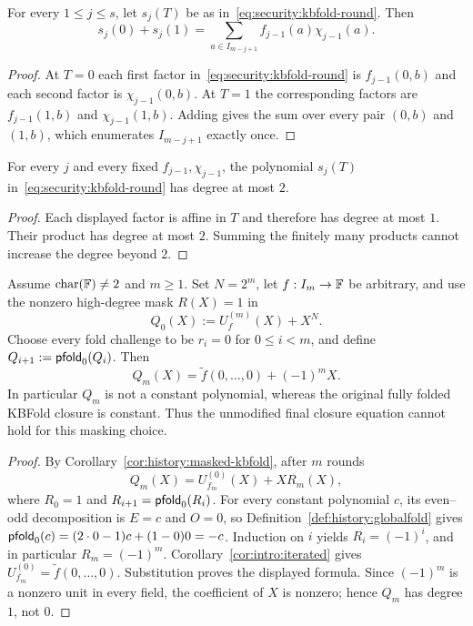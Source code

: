 \begin{lemma}\label{lem:security:kbfold-roundsum}
For every $1\leq j\leq s$, let $s_j(T)$ be as in~\eqref{eq:security:kbfold-round}. Then
\[
 s_j(0)+s_j(1)=
 \sum_{a\in I_{m-j+1}} f_{j-1}(a)\chi_{j-1}(a).
\]
\end{lemma}
\begin{proof}
At $T=0$ each first factor in~\eqref{eq:security:kbfold-round} is $f_{j-1}(0,b)$ and each second factor is $\chi_{j-1}(0,b)$. At $T=1$ the corresponding factors are $f_{j-1}(1,b)$ and $\chi_{j-1}(1,b)$. Adding gives the sum over every pair $(0,b)$ and $(1,b)$, which enumerates $I_{m-j+1}$ exactly once.
\end{proof}

\begin{lemma}\label{lem:security:kbfold-rounddegree}
For every $j$ and every fixed $f_{j-1},\chi_{j-1}$, the polynomial $s_j(T)$ in~\eqref{eq:security:kbfold-round} has degree at most $2$.
\end{lemma}
\begin{proof}
Each displayed factor is affine in $T$ and therefore has degree at most $1$. Their product has degree at most $2$. Summing the finitely many products cannot increase the degree beyond $2$.
\end{proof}

\begin{theorem}\label{thm:security:naive-closure}
Assume $\operatorname{char}(\mathbb{F})\neq2$ and $m\geq1$. Set $N=2^m$, let $f:I_m\to\mathbb{F}$ be arbitrary, and use the nonzero high-degree mask $R(X)=1$ in
\[
 Q_0(X):=U_f^{(m)}(X)+X^N.
\]
Choose every fold challenge to be $r_i=0$ for $0\leq i<m$, and define $Q_{i+1}:=\mathsf{pfold}_0(Q_i)$. Then
\[
 \boxed{Q_m(X)=\widetilde f(0,\ldots,0)+(-1)^m X.}
\]
In particular $Q_m$ is not a constant polynomial, whereas the original fully folded KBFold closure is constant. Thus the unmodified final closure equation cannot hold for this masking choice.
\end{theorem}
\begin{proof}
By Corollary~\ref{cor:history:masked-kbfold}, after $m$ rounds
\[
 Q_m(X)=U_{f_m}^{(0)}(X)+X R_m(X),
\]
where $R_0=1$ and $R_{i+1}=\mathsf{pfold}_0(R_i)$. For every constant polynomial $c$, its even--odd decomposition is $E=c$ and $O=0$, so Definition~\ref{def:history:globalfold} gives
$\mathsf{pfold}_0(c)=(2\cdot0-1)c+(1-0)0=-c$.
Induction on $i$ yields $R_i=(-1)^i$, and in particular $R_m=(-1)^m$. Corollary~\ref{cor:intro:iterated} gives
$U_{f_m}^{(0)}=\widetilde f(0,\ldots,0)$. Substitution proves the displayed formula. Since $(-1)^m$ is a nonzero unit in every field, the coefficient of $X$ is nonzero; hence $Q_m$ has degree $1$, not $0$.
\end{proof}

